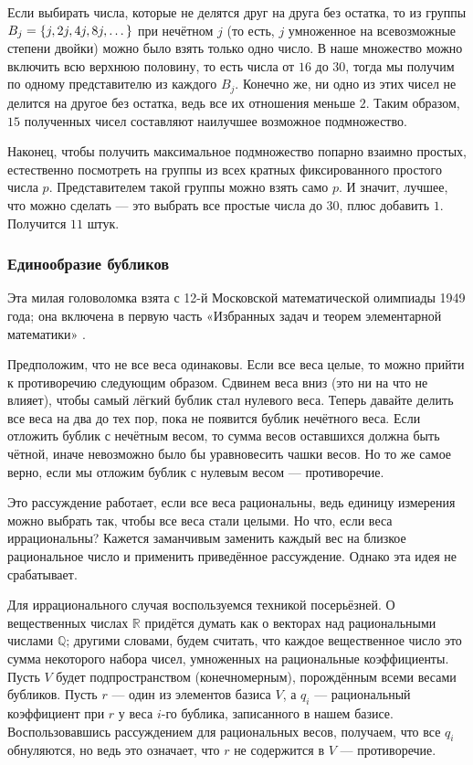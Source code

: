 Если выбирать числа, которые не делятся друг на друга без остатка, то из группы $B_j \z= \{j, 2j, 4j, 8j, \dots\}$ при нечётном $j$ (то есть, $j$ умноженное на всевозможные степени двойки) можно было взять только одно число.
В наше множество можно включить всю верхнюю половину, то есть числа от $16$ до $30$, тогда мы получим по одному представителю из каждого $B_j$.
Конечно же, ни одно из этих чисел не делится на другое без остатка, ведь все их отношения меньше $2$.
Таким образом, $15$ полученных чисел составляют наилучшее возможное подмножество.

Наконец, чтобы получить максимальное подмножество попарно взаимно простых, естественно посмотреть на группы из всех кратных фиксированного простого числа $p$.
Представителем такой группы можно взять само $p$. 
И значит, лучшее, что можно сделать — это выбрать все простые числа до $30$, плюс добавить $1$.
Получится $11$ штук.

\subsubsection*{Единообразие бубликов}

Эта милая головоломка взята с 12-й Московской математической олимпиады 1949 года;
она включена в первую часть «Избранных задач и теорем элементарной математики» %
\cite[задача 127, стр. 28]{51}.

Предположим, что не все веса одинаковы.
Если все веса целые, то можно прийти к противоречию следующим образом.
Сдвинем веса вниз (это ни на что не влияет), чтобы самый лёгкий бублик стал нулевого веса.
Теперь давайте делить все веса на два до тех пор, пока не появится бублик нечётного веса.
Если отложить бублик с нечётным весом, то сумма весов оставшихся должна быть чётной, иначе невозможно было бы уравновесить чашки весов.
Но то же самое верно, если мы отложим бублик с нулевым весом --- противоречие.

Это рассуждение работает, если все веса рациональны, ведь единицу измерения можно выбрать так, чтобы все веса стали целыми.
Но что, если веса иррациональны?
Кажется заманчивым заменить каждый вес на близкое рациональное число и применить приведённое рассуждение.
Однако эта идея не срабатывает.

Для иррационального случая воспользуемся техникой посерьёзней.
О вещественных числах $\mathbb{R}$ придётся думать как о векторах над рациональными числами $\mathbb{Q}$;
другими словами, будем считать, что каждое вещественное число это сумма некоторого набора чисел, умноженных на рациональные коэффициенты.
Пусть $V$ будет подпространством (конечномерным), порождённым всеми весами бубликов.
Пусть $r$ --- один из элементов базиса $V$, а $q_i$ --- рациональный коэффициент при $r$ у веса $i$-го бублика, записанного в нашем базисе.
Воспользовавшись рассуждением для рациональных весов, получаем, что все $q_i$ обнуляются, но ведь это означает, что $r$ не содержится в $V$ --- противоречие.

